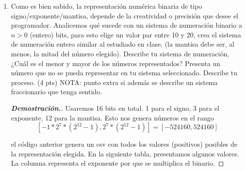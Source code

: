 \documentclass{article}
\begin{document}
\begin{enumerate}
	\item Como es bien sabido, la representaci\'on num\'erica binaria de tipo signo/exponente/mantisa, depende de la creatividad o precisi\'on que desee el programador. Analicemos qu\'e sucede con un sistema de numeraci\'on binario a $n>0$ (entero) bits, para esto elige un valor par entre 10 y 20, crea el sistema de numeraci\'on entero similar al estudiado en clase, (la mantisa debe ser, al menos, la mitad del n\'umero elegido). Describe tu sistema de numeraci\'on, ¿Cu\'al es el menor y mayor de los n\'umeros representados? Presenta un n\'umero que no se pueda representar en tu sistema seleccionado. Describe tu proceso. (4 pts) NOTA: punto extra si adem\'as se describe un sistema fraccionario que tenga sentido.
	      \begin{mdframed}[
			      linecolor=darkgray,
			      backgroundcolor=white]
		      \begin{proof}[\textbf{Demostraci\'on.}]
			      Usaremos 16 bits en total. 1 para el signo, 3 para el exponente, 12 para la mantisa. Esto nos genera n\'umeros en el rango
			      \[ [-1*2^7*(2^{12} - 1), 2^7*(2^{12} - 1)] = [-524160, 524160] \]

			      


			      el c\'odigo anterior genera un csv con todos los valores (positivos) posibles de la representaci\'on elegida. En la siguiente tabla, presentamos algunos valores. La columna representa el exponente por que se multiplica el binario. 


\end{proof}
\end{mdframed}
\end{enumerate}
\end{document}
